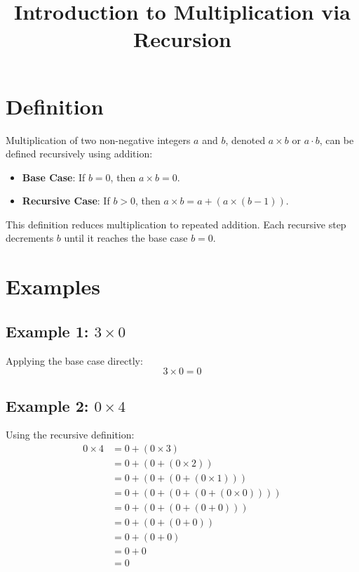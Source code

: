 \documentclass{article}
\title{Introduction to Multiplication via Recursion}
\author{}
\date{}
\begin{document}
\maketitle

\section{Definition}
Multiplication of two non-negative integers \( a \) and \( b \), denoted \( a \times b \) or \( a \cdot b \), can be defined recursively using addition:

\begin{itemize}
    \item \textbf{Base Case}: If \( b = 0 \), then \( a \times b = 0 \).
    \item \textbf{Recursive Case}: If \( b > 0 \), then \( a \times b = a + (a \times (b - 1)) \).
\end{itemize}

This definition reduces multiplication to repeated addition. Each recursive step decrements \( b \) until it reaches the base case \( b = 0 \).

\section{Examples}

\subsection{Example 1: \( 3 \times 0 \)}
Applying the base case directly:
\[
3 \times 0 = 0
\]

\subsection{Example 2: \( 0 \times 4 \)}
Using the recursive definition:
\[
\begin{aligned}
0 \times 4 &= 0 + (0 \times 3) \\
&= 0 + (0 + (0 \times 2)) \\
&= 0 + (0 + (0 + (0 \times 1))) \\
&= 0 + (0 + (0 + (0 + (0 \times 0)))) \\
&= 0 + (0 + (0 + (0 + 0))) \\
&= 0 + (0 + (0 + 0)) \\
&= 0 + (0 + 0) \\
&= 0 + 0 \\
&= 0
\end{aligned}
\]
\end{document}
